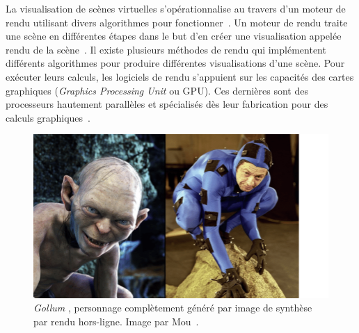 La visualisation de scènes virtuelles s'opérationnalise au travers d'un moteur de rendu utilisant divers algorithmes pour fonctionner~\cite{sherman_chapter_2003}. Un moteur de rendu traite une scène en différentes étapes dans le but d'en créer une visualisation appelée rendu de la scène~\cite{pharr_physically_2023}. Il existe plusieurs méthodes de rendu qui implémentent différents algorithmes pour produire différentes visualisations d'une scène. Pour exécuter leurs calculs, les logiciels de rendu s'appuient sur les capacités des cartes graphiques (\textit{Graphics Processing Unit} ou GPU). Ces dernières sont des processeurs hautement parallèles et spécialisés dès leur fabrication pour des calculs graphiques~\cite{das_history_2016}.

\bigskip

\begin{figure}[h]
    \centering
    \includegraphics[width=.65\textwidth]{contenu/resources/images/gollum}
    \caption[\textit{Gollum} (2002), \textit{Le Seigneur des Anneaux : Les Deux Tours}]{\textit{Gollum} \protect\footnotemark, personnage complètement généré par image de synthèse par rendu hors-ligne. Image par Mou~\cite{mou_keyframe_2018}.}
    \label{fig:gollum}
\end{figure}


